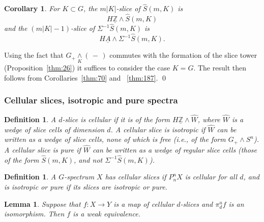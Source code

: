 \documentclass{amsart}
\newtheorem{cor}[equation]{Corollary}
\newtheorem{lem}[equation]{Lemma}
\newtheorem{definition}[equation]{Definition}
\newenvironment{defin}{\begin{definition}\rm}{\end{definition}}
\theoremstyle{definition}
\newtheorem{defin}[equation]{Definition}
\theoremstyle{remark}
\newenvironment{pf}{\bigskip{\em Proof:\/}}{\qed\medskip}
\newcommand{\Z}{{\mathbb Z}}
\newcommand{\slot}{\,-\,}
\newcommand{\slc}[2]{P_{#1}^{#1}#2}
\newcommand{\smashove}[1]{\underset{#1}{\wedge}}
\newcommand{\piu}{\pi^{u}}
\newcommand{\Zm}{\underline{\Z}}
\newcommand{\Am}{\underline{A}}
\newcommand{\slicecell}{\widehat{S}}
\newcommand{\refine}{\widehat{W}}
\begin{document}
\begin{cor}
\label{thm:22}
For $K\subset G$, the $m|K|$-slice of $\slicecell(m,K)$ is 
\[
H\Zm\wedge \slicecell(m,K)
\]
and the $(m|K|-1)$-slice of $\Sigma^{-1}\slicecell(m,K)$ is 
\[
H\Am \wedge \Sigma^{-1}\slicecell(m,K).
\]
\end{cor}

\begin{pf}
Using the fact that $G_{+}\smashove{K}(\slot)$ commutes with the
formation of the slice tower (Proposition~\ref{thm:26}) it suffices to
consider the case $K=G$.  The result then follows from
Corollaries~\ref{thm:70} and ~\ref{thm:187}.
\end{pf}

\subsubsection{Cellular slices, isotropic and pure spectra}
\label{sec:even-spectra}

\begin{defin}
\label{def:13} A $d$-slice is {\em cellular} if it is of the form
$H\Zm\wedge \refine$, where $\refine$ is a wedge of slice cells of
dimension $d$.  A cellular slice is {\em isotropic} if $\refine$ can
be written as a wedge of slice cells, none of which is free (i.e., of
the form $G_{+}\wedge S^{n}$).  A cellular slice is {\em pure} if
$\refine$ can be written as a wedge of regular slice cells (those of
the form $\slicecell(m,K)$, and not $\Sigma^{-1}\slicecell(m,K)$).
\end{defin}

\begin{defin}
\label{def:31} A $G$-spectrum $X$ {\em has cellular slices} if
$\slc{n}{X}$ is cellular for all $d$, and is {\em isotropic} or {\em
pure} if its slices are isotropic or pure.
\end{defin}

\begin{lem}
\label{thm:118}
Suppose that $f:X\to Y$ is a map of cellular $d$-slices and
$\piu_{d}f$ is an isomorphism.  Then $f$ is a weak equivalence.
\end{lem}
\end{document}

